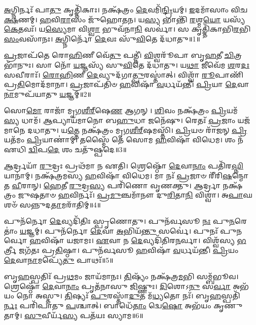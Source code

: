 \-\ul{𑌅}\-𑌗𑍍𑌨𑌿𑌰𑍍𑌨𑌃᳴ 𑌪𑌾\-\ul{𑌤𑍁} 𑌕𑍃𑌤𑍍𑌤𑌿᳴𑌕𑌾𑌃। 
𑌨𑌕𑍍𑌷᳴𑌤𑍍𑌰𑌂 \ul{𑌦𑍇}\-𑌵𑌮𑌿᳴\-\ul{𑌨𑍍𑌦𑍍𑌰𑌿}\-𑌯𑌮𑍍। 
\-\ul{𑌇}\-𑌦𑌮𑌾᳴𑌸𑌾𑌂 𑌵𑌿𑌚\-\ul{𑌕𑍍𑌷}\-𑌣𑌮𑍍। 
\-\ul{𑌹}\-𑌵𑌿\-\ul{𑌰𑌾}\-𑌸𑌂 𑌜𑍁᳴𑌹𑍋𑌤𑌨। 
𑌯\-\ul{𑌸𑍍𑌯} 𑌭𑌾𑌨𑍍𑌤𑌿᳴ \ul{𑌰}\-𑌶𑍍𑌮\-\ul{𑌯𑍋} 𑌯𑌸𑍍𑌯᳴ \ul{𑌕𑍇}\-𑌤𑌵𑌃᳴। 
𑌯\-\ul{𑌸𑍍𑌯𑍇}\-𑌮𑌾 𑌵𑌿\-\ul{𑌶𑍍𑌵𑌾} 𑌭𑍁𑌵᳴𑌨𑌾\-\ul{𑌨𑌿} 𑌸𑌰𑍍𑌵𑌾॑। 
𑌸 𑌕𑍃𑌤𑍍𑌤𑌿᳴𑌕𑌾𑌭𑌿\-\-\ul{𑌰}\-𑌭𑌿\-\ul{𑌸𑌂}\-𑌵𑌸𑌾᳴𑌨𑌃। 
\-\ul{𑌅}\-𑌗𑍍𑌨𑌿𑌰𑍍𑌨𑍋᳴ \ul{𑌦𑍇}\-𑌵𑌃 𑌸𑍁᳴\-\ul{𑌵𑌿}\-𑌤𑍇 𑌦᳴𑌧𑌾𑌤𑍁॥1॥ 

\-\ul{𑌪𑍍𑌰}\-𑌜𑌾𑌪᳴𑌤𑍇 𑌰𑍋\-\ul{𑌹𑌿}\-𑌣𑍀 𑌵𑍇᳴\-\ul{𑌤𑍁} 𑌪𑌤𑍍𑌨𑍀॑। 
\-\ul{𑌵𑌿}\-𑌶𑍍𑌵𑌰𑍂᳴𑌪𑌾 𑌬𑍃\-\ul{𑌹}\-𑌤𑍀 \ul{𑌚𑌿}\-𑌤𑍍𑌰𑌭𑌾᳴𑌨𑍁𑌃। 
𑌸𑌾 𑌨𑍋᳴ \ul{𑌯}\-𑌜𑍍𑌞𑌸𑍍𑌯᳴ 𑌸𑍁\-\ul{𑌵𑌿}\-𑌤𑍇 𑌦᳴𑌧𑌾𑌤𑍁। 
𑌯\-\ul{𑌥𑌾} 𑌜𑍀𑌵𑍇᳴𑌮 \ul{𑌶}\-𑌰\-\ul{𑌦𑌃} 𑌸𑌵𑍀𑌰𑌾𑌃᳴। 
\-\ul{𑌰𑍋}\-\-\ul{𑌹𑌿}\-𑌣𑍀 \ul{𑌦𑍇}\-𑌵𑍍𑌯𑍁𑌦᳴𑌗𑌾\-\ul{𑌤𑍍𑌪𑍁}\-𑌰𑌸𑍍𑌤𑌾॑𑌤𑍍। 
𑌵𑌿𑌶𑍍𑌵𑌾᳴ \ul{𑌰𑍂}\-𑌪𑌾𑌣𑌿᳴ 𑌪𑍍𑌰\-\ul{𑌤𑌿}\-𑌮𑍋𑌦᳴𑌮𑌾𑌨𑌾। 
\-\ul{𑌪𑍍𑌰}\-𑌜𑌾𑌪᳴𑌤𑌿𑍞 \ul{𑌹}\-𑌵𑌿𑌷𑌾᳴ \ul{𑌵}\-𑌰𑍍𑌧𑌯᳴𑌨𑍍𑌤𑍀। 
\-\ul{𑌪𑍍𑌰𑌿}\-𑌯𑌾 \ul{𑌦𑍇}\-𑌵𑌾\-\ul{𑌨𑌾}\-𑌮𑍁𑌪᳴𑌯𑌾𑌤𑍁 \ul{𑌯}\-𑌜𑍍𑌞𑌮𑍍॥2॥ 

𑌸𑍋\-\ul{𑌮𑍋} 𑌰𑌾𑌜𑌾᳴ 𑌮𑍃𑌗\-\ul{𑌶𑍀}\-\ul{𑌰𑍍}‌𑌷𑍇\-\ul{𑌣} 𑌆𑌗𑌨𑍍। 
\-\ul{𑌶𑌿}\-𑌵𑌂 𑌨𑌕𑍍𑌷᳴𑌤𑍍𑌰𑌂 \ul{𑌪𑍍𑌰𑌿}\-𑌯𑌮᳴\-\ul{𑌸𑍍𑌯} 𑌧𑌾𑌮᳴। 
\-\ul{𑌆}\-𑌪𑍍𑌯𑌾𑌯᳴𑌮𑌾𑌨𑍋 𑌬\-\ul{𑌹𑍁}\-𑌧𑌾 𑌜𑌨𑍇᳴𑌷𑍁। 
𑌰𑍇𑌤𑌃᳴ \ul{𑌪𑍍𑌰}\-𑌜𑌾𑌂 𑌯𑌜᳴𑌮𑌾𑌨𑍇 𑌦𑌧𑌾𑌤𑍁। 
𑌯\-\ul{𑌤𑍍𑌤𑍇} 𑌨𑌕𑍍𑌷᳴𑌤𑍍𑌰𑌂 𑌮𑍃𑌗\-\ul{𑌶𑍀}\-\ul{𑌰𑍍}‌𑌷𑌮𑌸𑍍𑌤𑌿᳴। 
\-\ul{𑌪𑍍𑌰𑌿}\-𑌯𑍞 𑌰𑌾᳴𑌜𑌨𑍍 \ul{𑌪𑍍𑌰𑌿}\-𑌯𑌤᳴𑌮𑌂 \ul{𑌪𑍍𑌰𑌿}\-𑌯𑌾𑌣𑌾॑𑌮𑍍। 
𑌤𑌸𑍍𑌮𑍈᳴ 𑌤𑍇 𑌸𑍋𑌮 \ul{𑌹}\-𑌵𑌿𑌷𑌾᳴ 𑌵𑌿𑌧𑍇𑌮। 
𑌶𑌂 𑌨᳴ 𑌏𑌧𑌿 \ul{𑌦𑍍𑌵𑌿}\-𑌪\-\ul{𑌦𑍇} 𑌶𑌂 𑌚𑌤𑍁᳴𑌷𑍍𑌪𑌦𑍇॥3॥ 

\-\ul{𑌆}\-𑌰𑍍𑌦𑍍𑌰𑌯𑌾᳴ \ul{𑌰𑍁}\-𑌦𑍍𑌰𑌃 𑌪𑍍𑌰𑌥᳴𑌮𑌾 𑌨 𑌏𑌤𑌿। 
𑌶𑍍𑌰𑍇𑌷𑍍𑌠𑍋᳴ \ul{𑌦𑍇}\-𑌵𑌾\-\ul{𑌨𑌾𑌂} 𑌪𑌤𑌿᳴𑌰\-\ul{𑌘𑍍𑌨𑌿}\-𑌯𑌾𑌨𑌾॑𑌮𑍍। 
𑌨𑌕𑍍𑌷᳴𑌤𑍍𑌰𑌮𑌸𑍍𑌯 \ul{𑌹}\-𑌵𑌿𑌷𑌾᳴ 𑌵𑌿𑌧𑍇𑌮। 
𑌮𑌾 𑌨𑌃᳴ \ul{𑌪𑍍𑌰}\-𑌜𑌾𑍞 𑌰𑍀᳴𑌰𑌿\-\ul{𑌷}\-𑌨𑍍𑌮𑍋𑌤 \ul{𑌵𑍀}\-𑌰𑌾𑌨𑍍। 
\-\ul{𑌹𑍇}\-𑌤𑍀 \ul{𑌰𑍁}\-𑌦𑍍𑌰\-\ul{𑌸𑍍𑌯} 𑌪𑌰𑌿᳴𑌣𑍋 𑌵𑍃𑌣𑌕𑍍𑌤𑍁। 
\-\ul{𑌆}\-𑌰𑍍𑌦𑍍𑌰𑌾 𑌨𑌕𑍍𑌷᳴𑌤𑍍𑌰𑌂 𑌜𑍁𑌷𑌤𑌾𑍞 \ul{𑌹}\-𑌵𑌿𑌰𑍍𑌨𑌃᳴। 
\-\ul{𑌪𑍍𑌰}\-\-\ul{𑌮𑍁}\-𑌞𑍍𑌚𑌮𑌾᳴𑌨𑍗 𑌦𑍁\-\ul{𑌰𑌿}\-𑌤𑌾\-\ul{𑌨𑌿} 𑌵𑌿𑌶𑍍𑌵𑌾॑। 
𑌅\-\ul{𑌪𑌾}\-𑌘𑌶𑍞᳴ 𑌸𑌨𑍍𑌨𑍁𑌦\-\ul{𑌤𑌾}\-𑌮𑌰𑌾᳴𑌤𑌿𑌮𑍍॥4॥ 

𑌪𑍁𑌨᳴𑌰𑍍𑌨𑍋 \ul{𑌦𑍇}\-𑌵𑍍𑌯𑌦𑌿᳴𑌤𑌿𑌃 𑌸𑍍𑌪𑍃𑌣𑍋𑌤𑍁। 
𑌪𑍁𑌨᳴𑌰𑍍𑌵𑌸𑍂 \ul{𑌨𑌃} 𑌪𑍁\-\ul{𑌨}\-𑌰𑍇𑌤𑌾𑌂॑ \ul{𑌯}\-𑌜𑍍𑌞𑌮𑍍। 
𑌪𑍁𑌨᳴𑌰𑍍𑌨𑍋 \ul{𑌦𑍇}\-𑌵𑌾 \ul{𑌅}\-𑌭𑌿𑌯᳴\-\ul{𑌨𑍍𑌤𑍁} 𑌸𑌰𑍍𑌵𑍇॑। 
𑌪𑍁𑌨𑌃᳴ 𑌪𑍁𑌨𑌰𑍍𑌵𑍋 \ul{𑌹}\-𑌵𑌿𑌷𑌾᳴ 𑌯𑌜𑌾𑌮𑌃। 
\-\ul{𑌏}\-𑌵𑌾 𑌨 \ul{𑌦𑍇}\-𑌵𑍍𑌯𑌦𑌿᳴𑌤𑌿𑌰\-\ul{𑌨}\-𑌰𑍍𑌵𑌾। 
𑌵𑌿𑌶𑍍𑌵᳴𑌸𑍍𑌯 \ul{𑌭}\-𑌰𑍍𑌤𑍍𑌰𑍀 𑌜𑌗᳴𑌤𑌃 𑌪𑍍𑌰\-\ul{𑌤𑌿}\-𑌷𑍍𑌠𑌾। 
𑌪𑍁𑌨᳴𑌰𑍍𑌵𑌸𑍂 \ul{𑌹}\-𑌵𑌿𑌷𑌾᳴ \ul{𑌵}\-𑌰𑍍𑌧𑌯᳴𑌨𑍍𑌤𑍀। 
\-\ul{𑌪𑍍𑌰𑌿}\-𑌯𑌂 \ul{𑌦𑍇}\-𑌵𑌾\-\ul{𑌨𑌾}\-𑌮𑌪𑍍𑌯𑍇᳴\-\ul{𑌤𑍁} 𑌪𑌾𑌥𑌃᳴॥5॥ 

𑌬𑍃\-\ul{𑌹}\-𑌸𑍍𑌪𑌤𑌿𑌃᳴ 𑌪𑍍𑌰\-\ul{𑌥}\-𑌮𑌂 𑌜𑌾𑌯᳴𑌮𑌾𑌨𑌃। 
\-\ul{𑌤𑌿}\-𑌷𑍍𑌯𑌂᳴ 𑌨𑌕𑍍𑌷᳴𑌤𑍍𑌰\-\ul{𑌮}\-𑌭𑌿 𑌸𑌮𑍍𑌬᳴𑌭𑍂𑌵। 
𑌶𑍍𑌰𑍇𑌷𑍍𑌠𑍋᳴ \ul{𑌦𑍇}\-𑌵𑌾\-\ul{𑌨𑌾𑌂} 𑌪𑍃𑌤᳴𑌨𑌾𑌸𑍁  \ul{𑌜𑌿}\-𑌷𑍍𑌣𑍁𑌃। 
\-\ul{𑌦𑌿}\-𑌶𑍋𑌽\-\ul{𑌨𑍁} 𑌸\-\ul{𑌰𑍍𑌵𑌾} 𑌅𑌭᳴𑌯𑌂 𑌨𑍋 𑌅𑌸𑍍𑌤𑍁। 
\-\ul{𑌤𑌿}\-𑌷𑍍𑌯𑌃᳴ \ul{𑌪𑍁}\-𑌰𑌸𑍍𑌤𑌾᳴\-\ul{𑌦𑍁}\-𑌤 𑌮᳴\-\ul{𑌧𑍍𑌯}\-𑌤𑍋 𑌨𑌃᳴। 
𑌬𑍃\-\ul{𑌹}\-𑌸𑍍𑌪𑌤𑌿᳴\-\ul{𑌰𑍍𑌨𑌃} 𑌪𑌰𑌿᳴𑌪𑌾𑌤𑍁 \ul{𑌪}\-𑌶𑍍𑌚𑌾𑌤𑍍। 
𑌬𑌾𑌧𑍇᳴\-\ul{𑌤𑌾𑌂} 𑌦𑍍𑌵𑍇\-\ul{𑌷𑍋} 𑌅𑌭᳴𑌯𑌂 𑌕𑍃𑌣𑍁𑌤𑌾𑌮𑍍। 
\-\ul{𑌸𑍁}\-𑌵𑍀𑌰𑍍𑌯᳴\-\ul{𑌸𑍍𑌯} 𑌪𑌤᳴𑌯𑌃 𑌸𑍍𑌯𑌾𑌮॥6॥ 

